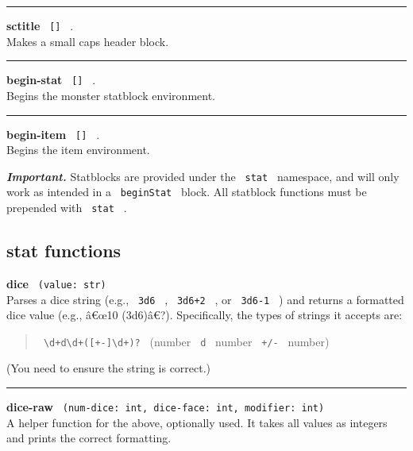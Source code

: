 \begin{center}\rule{0.5\linewidth}{0.5pt}\end{center}

\textbf{sctitle} \texttt{\ {[}{]}\ } .\\
Makes a small caps header block.

\begin{center}\rule{0.5\linewidth}{0.5pt}\end{center}

\textbf{begin-stat} \texttt{\ {[}{]}\ } .\\
Begins the monster statblock environment.

\begin{center}\rule{0.5\linewidth}{0.5pt}\end{center}

\textbf{begin-item} \texttt{\ {[}{]}\ } .\\
Begins the item environment.

\emph{\textbf{Important.}} Statblocks are provided under the
\texttt{\ stat\ } namespace, and will only work as intended in a
\texttt{\ beginStat\ } block. All statblock functions must be prepended
with \texttt{\ stat\ } .

\subsection{stat functions}\label{stat-functions}

\textbf{dice} \texttt{\ (value:\ str)\ }\\
Parses a dice string (e.g., \texttt{\ 3d6\ } , \texttt{\ 3d6+2\ } , or
\texttt{\ 3d6-1\ } ) and returns a formatted dice value (e.g., â€œ10
(3d6)â€?). Specifically, the types of strings it accepts are:

\begin{quote}
\texttt{\ \textbackslash{}d+d\textbackslash{}d+({[}+-{]}\textbackslash{}d+)?\ }
(number \texttt{\ d\ } number \texttt{\ +/-\ } number)
\end{quote}

(You need to ensure the string is correct.)

\begin{center}\rule{0.5\linewidth}{0.5pt}\end{center}

\textbf{dice-raw}
\texttt{\ (num-dice:\ int,\ dice-face:\ int,\ modifier:\ int)\ }\\
A helper function for the above, optionally used. It takes all values as
integers and prints the correct formatting.

